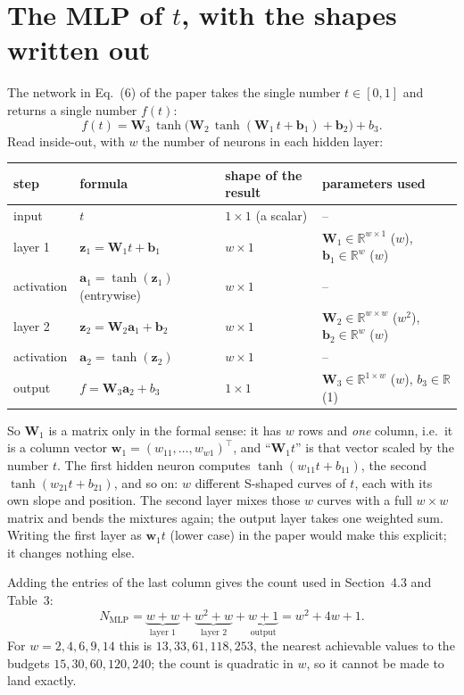 \documentclass[11pt,a4paper]{article}
\begin{document}
\section{The MLP of $t$, with the shapes written out}
The network in Eq.~(6) of the paper takes the single number $t\in[0,1]$ and returns a single number $f(t)$:
\begin{equation}
f(t)=\bm W_3\,\tanh\!\bigl(\bm W_2\,\tanh(\bm W_1\,t+\bm b_1)+\bm b_2\bigr)+b_3 .
\label{eq:mlp}
\end{equation}
Read inside-out, with $w$ the number of neurons in each hidden layer:
\begin{center}
\renewcommand{\arraystretch}{1.25}
\begin{tabular}{llll}
\toprule
step & formula & shape of the result & parameters used \\
\midrule
input & $t$ & $1\times1$ (a scalar) & -- \\
layer 1 & $\bm z_1=\bm W_1 t+\bm b_1$ & $w\times1$ & $\bm W_1\in\mathbb R^{w\times1}$ ($w$), $\bm b_1\in\mathbb R^{w}$ ($w$)\\
activation & $\bm a_1=\tanh(\bm z_1)$ (entrywise) & $w\times1$ & -- \\
layer 2 & $\bm z_2=\bm W_2\bm a_1+\bm b_2$ & $w\times1$ & $\bm W_2\in\mathbb R^{w\times w}$ ($w^2$), $\bm b_2\in\mathbb R^{w}$ ($w$)\\
activation & $\bm a_2=\tanh(\bm z_2)$ & $w\times1$ & -- \\
output & $f=\bm W_3\bm a_2+b_3$ & $1\times1$ & $\bm W_3\in\mathbb R^{1\times w}$ ($w$), $b_3\in\mathbb R$ (1)\\
\bottomrule
\end{tabular}
\end{center}
So $\bm W_1$ is a matrix only in the formal sense: it has $w$ rows and \emph{one} column, i.e.\ it is a column vector $\bm w_1=(w_{11},\dots,w_{w1})^{\!\top}$, and ``$\bm W_1 t$'' is that vector scaled by the number $t$. The first hidden neuron computes $\tanh(w_{11}t+b_{11})$, the second $\tanh(w_{21}t+b_{21})$, and so on: $w$ different S-shaped curves of $t$, each with its own slope and position. The second layer mixes those $w$ curves with a full $w\times w$ matrix and bends the mixtures again; the output layer takes one weighted sum. Writing the first layer as $\bm w_1 t$ (lower case) in the paper would make this explicit; it changes nothing else.

Adding the entries of the last column gives the count used in Section~4.3 and Table~3:
\begin{equation}
N_{\text{MLP}}=\underbrace{w+w}_{\text{layer 1}}+\underbrace{w^2+w}_{\text{layer 2}}+\underbrace{w+1}_{\text{output}}=w^2+4w+1 .
\end{equation}
For $w=2,4,6,9,14$ this is $13,33,61,118,253$, the nearest achievable values to the budgets $15,30,60,120,240$; the count is quadratic in $w$, so it cannot be made to land exactly.
\end{document}
